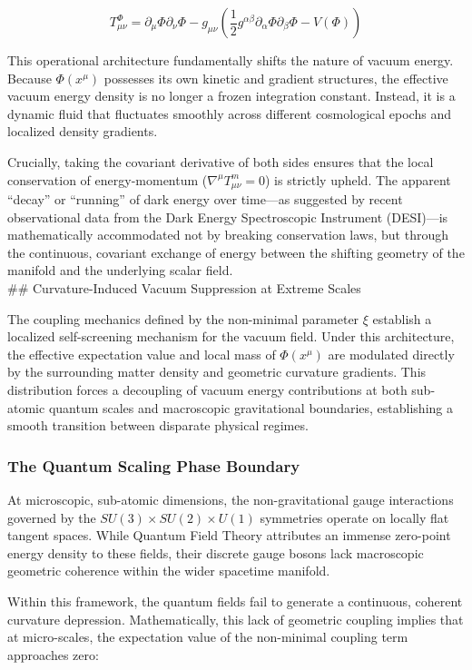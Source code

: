\[T_{\mu\nu}^\Phi = \partial_\mu\Phi\partial_\nu\Phi - g_{\mu\nu}\left( \frac{1}{2}g^{\alpha\beta}\partial_\alpha\Phi\partial_\beta\Phi - V(\Phi) \right)\]

This operational architecture fundamentally shifts the nature of vacuum
energy. Because \(\Phi(x^\mu)\) possesses its own kinetic and gradient
structures, the effective vacuum energy density is no longer a frozen
integration constant. Instead, it is a dynamic fluid that fluctuates
smoothly across different cosmological epochs and localized density
gradients.

Crucially, taking the covariant derivative of both sides ensures that
the local conservation of energy-momentum
(\(\nabla^\mu T_{\mu\nu}^m = 0\)) is strictly upheld. The apparent
``decay'' or ``running'' of dark energy over time---as suggested by
recent observational data from the Dark Energy Spectroscopic Instrument
(DESI)---is mathematically accommodated not by breaking conservation
laws, but through the continuous, covariant exchange of energy between
the shifting geometry of the manifold and the underlying scalar field.\\
\#\# Curvature-Induced Vacuum Suppression at Extreme Scales

The coupling mechanics defined by the non-minimal parameter \(\xi\)
establish a localized self-screening mechanism for the vacuum field.
Under this architecture, the effective expectation value and local mass
of \(\Phi(x^\mu)\) are modulated directly by the surrounding matter
density and geometric curvature gradients. This distribution forces a
decoupling of vacuum energy contributions at both sub-atomic quantum
scales and macroscopic gravitational boundaries, establishing a smooth
transition between disparate physical regimes.

\subsubsection{The Quantum Scaling Phase
Boundary}\label{the-quantum-scaling-phase-boundary}

At microscopic, sub-atomic dimensions, the non-gravitational gauge
interactions governed by the \(SU(3) \times SU(2) \times U(1)\)
symmetries operate on locally flat tangent spaces. While Quantum Field
Theory attributes an immense zero-point energy density to these fields,
their discrete gauge bosons lack macroscopic geometric coherence within
the wider spacetime manifold.

Within this framework, the quantum fields fail to generate a continuous,
coherent curvature depression. Mathematically, this lack of geometric
coupling implies that at micro-scales, the expectation value of the
non-minimal coupling term approaches zero:

